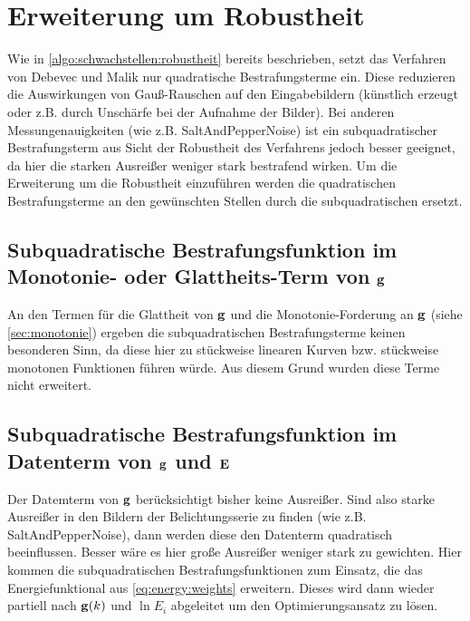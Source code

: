 \section{Erweiterung um Robustheit}
\label{sec:robustheit}

Wie in \autoref{algo:schwachstellen:robustheit} bereits beschrieben, setzt das Verfahren von Debevec und Malik nur quadratische Bestrafungsterme ein. Diese reduzieren die Auswirkungen von Gauß-Rauschen auf den Eingabebildern (künstlich erzeugt oder z.B. durch Unschärfe bei der Aufnahme der Bilder). Bei anderen Messungenauigkeiten (wie z.B. \gls{SaltAndPepperNoise}) ist ein subquadratischer Bestrafungsterm aus Sicht der Robustheit des Verfahrens jedoch besser geeignet, da hier die starken Ausreißer weniger stark bestrafend wirken. Um die Erweiterung um die Robustheit einzuführen werden die quadratischen Bestrafungsterme an den gewünschten Stellen durch die subquadratischen ersetzt. 


\subsection{Subquadratische Bestrafungsfunktion im Monotonie- oder Glattheits-Term von $\mathbf g$}
An den Termen für die Glattheit von $\mathbf g$ und die Monotonie-Forderung an $\mathbf g$ (siehe \autoref{sec:monotonie}) ergeben die subquadratischen Bestrafungsterme keinen besonderen Sinn, da diese hier zu stückweise linearen Kurven bzw. stückweise monotonen Funktionen führen würde. Aus diesem Grund wurden diese Terme nicht erweitert.


\subsection{Subquadratische Bestrafungsfunktion im Datenterm von $\mathbf g$ und $\mathbf E$}
Der Datemterm von $\mathbf g$ berücksichtigt bisher keine Ausreißer. Sind also starke Ausreißer in den Bildern der Belichtungsserie zu finden (wie z.B. \gls{SaltAndPepperNoise}), dann werden diese den Datenterm quadratisch beeinflussen. Besser wäre es hier große Ausreißer weniger stark zu gewichten.
Hier kommen die subquadratischen Bestrafungsfunktionen zum Einsatz, die das Energiefunktional aus \autoref{eq:energy:weights} erweitern. Dieses wird dann wieder partiell nach $\mathbf g(k)$ und $\ln E_i$ abgeleitet um den Optimierungsansatz zu lösen. 

